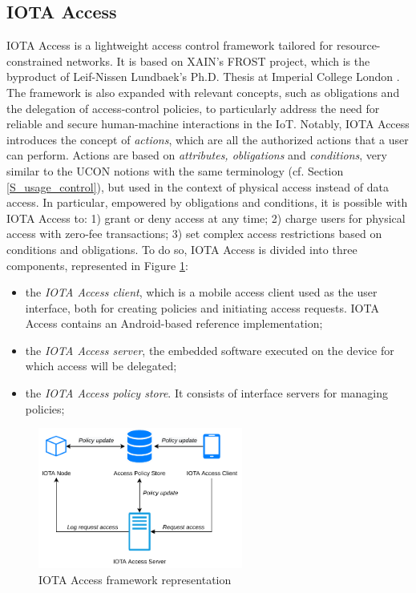 \subsection{IOTA Access}
 
 IOTA Access is a lightweight access control framework tailored for resource-constrained networks.
 It is based on XAIN's FROST project, which is the byproduct of Leif-Nissen Lundbaek's Ph.D. Thesis at Imperial College London \cite{Lundbaek2020}.
 The framework is also expanded with relevant concepts, such as obligations and the delegation of access-control policies,
  to particularly address the need for reliable and secure human-machine interactions in the IoT. Notably, IOTA Access 
  introduces the concept of \emph{actions}, which are all the authorized actions that a user can perform. Actions 
  are based on \emph{attributes, obligations} and \emph{conditions}, very similar to the UCON notions with the same terminology (cf. Section \ref{S_usage_control}), but used
  in the context of physical access instead of data access. In particular, empowered by obligations and conditions, it is possible with IOTA Access to:
     1) grant or deny access at any time;
    2) charge users for physical access with zero-fee transactions; 3) set complex access restrictions based on conditions and obligations.
    To do so, IOTA Access is divided into three components, represented in Figure \ref{F_iota_access}:

    \begin{itemize}
      \item the \emph{IOTA Access client}, which is a mobile access client used as the user interface,
       both for creating policies and initiating access requests. IOTA Access contains an Android-based reference implementation;
       \item the \emph{IOTA Access server}, the embedded software executed on the device for which access will be delegated;
       \item the \emph{IOTA Access policy store}. It consists of interface servers for managing policies;
    \end{itemize}
  

 \begin{figure}[t]
   \centering
    \includegraphics[width=0.6\textwidth]{Images/iota_access.pdf}
   \caption{IOTA Access framework representation}
   \label{F_iota_access}
   \end{figure}

